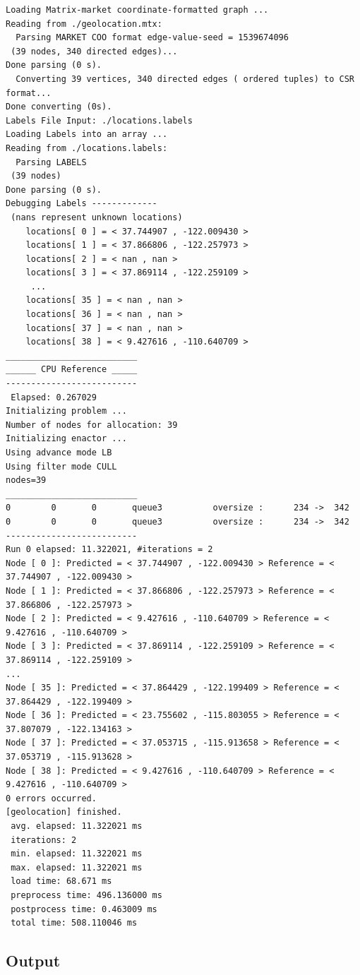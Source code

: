 \documentclass[10pt,oneside]{memoir}
\begin{document}
\begin{verbatim}
Loading Matrix-market coordinate-formatted graph ...
Reading from ./geolocation.mtx:
  Parsing MARKET COO format edge-value-seed = 1539674096
 (39 nodes, 340 directed edges)...
Done parsing (0 s).
  Converting 39 vertices, 340 directed edges ( ordered tuples) to CSR format...
Done converting (0s).
Labels File Input: ./locations.labels
Loading Labels into an array ...
Reading from ./locations.labels:
  Parsing LABELS
 (39 nodes)
Done parsing (0 s).
Debugging Labels -------------
 (nans represent unknown locations)
    locations[ 0 ] = < 37.744907 , -122.009430 >
    locations[ 1 ] = < 37.866806 , -122.257973 >
    locations[ 2 ] = < nan , nan >
    locations[ 3 ] = < 37.869114 , -122.259109 >
     ...
    locations[ 35 ] = < nan , nan >
    locations[ 36 ] = < nan , nan >
    locations[ 37 ] = < nan , nan >
    locations[ 38 ] = < 9.427616 , -110.640709 >
__________________________
______ CPU Reference _____
--------------------------
 Elapsed: 0.267029
Initializing problem ...
Number of nodes for allocation: 39
Initializing enactor ...
Using advance mode LB
Using filter mode CULL
nodes=39
__________________________
0        0       0       queue3          oversize :      234 ->  342
0        0       0       queue3          oversize :      234 ->  342
--------------------------
Run 0 elapsed: 11.322021, #iterations = 2
Node [ 0 ]: Predicted = < 37.744907 , -122.009430 > Reference = < 37.744907 , -122.009430 >
Node [ 1 ]: Predicted = < 37.866806 , -122.257973 > Reference = < 37.866806 , -122.257973 >
Node [ 2 ]: Predicted = < 9.427616 , -110.640709 > Reference = < 9.427616 , -110.640709 >
Node [ 3 ]: Predicted = < 37.869114 , -122.259109 > Reference = < 37.869114 , -122.259109 >
...
Node [ 35 ]: Predicted = < 37.864429 , -122.199409 > Reference = < 37.864429 , -122.199409 >
Node [ 36 ]: Predicted = < 23.755602 , -115.803055 > Reference = < 37.807079 , -122.134163 >
Node [ 37 ]: Predicted = < 37.053715 , -115.913658 > Reference = < 37.053719 , -115.913628 >
Node [ 38 ]: Predicted = < 9.427616 , -110.640709 > Reference = < 9.427616 , -110.640709 >
0 errors occurred.
[geolocation] finished.
 avg. elapsed: 11.322021 ms
 iterations: 2
 min. elapsed: 11.322021 ms
 max. elapsed: 11.322021 ms
 load time: 68.671 ms
 preprocess time: 496.136000 ms
 postprocess time: 0.463009 ms
 total time: 508.110046 ms
\end{verbatim}

\hypertarget{output}{%
\subsection{Output}\label{output}}
\end{document}
